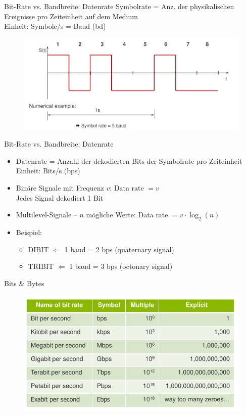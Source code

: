 \documentclass[xcolor=dvipsnames,aspectratio=169]{beamer}
\begin{document}
\begin{frame}{Bit-Rate vs. Bandbreite: Datenrate}
Symbolrate = Anz. der physikalischen Ereignisse pro Zeiteinheit auf dem Medium\\
Einheit: Symbole/s = Baud (bd)

\begin{figure}
\centering
\includegraphics[scale=0.25]{bd}
\end{figure}
\end{frame}

\begin{frame}{Bit-Rate vs. Bandbreite: Datenrate}
\begin{itemize}
	\item Datenrate = Anzahl der dekodierten Bits der Symbolrate pro Zeiteinheit\\
Einheit: Bits/s (bps)
	\item Binäre Signale mit Frequenz $v$: Data rate $=v$\\
	Jedes Signal dekodiert 1 Bit
	\item Multilevel-Signale -- $n$ mögliche Werte: Data rate $= v \cdot \log_2(n)$
	\item Beispiel:
	\begin{itemize}
		\item DIBIT $\Leftarrow$ 1 baud = 2 bps (quaternary signal)
		\item TRIBIT $\Leftarrow$ 1 baud = 3 bps (octonary signal)
	\end{itemize}
\end{itemize}
\end{frame}

\begin{frame}{Bits \& Bytes}
\begin{figure}
	\includegraphics[scale=.4]{tab1}
\end{figure}
\end{frame}
\end{document}
